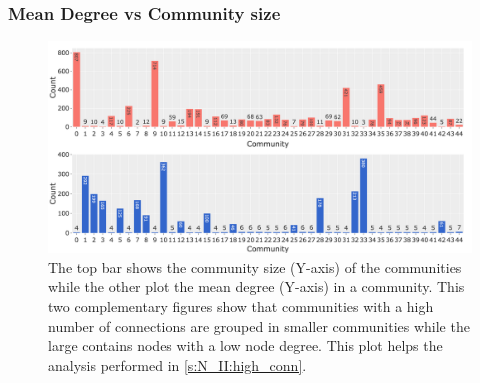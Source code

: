 \subsubsection{Mean Degree vs Community size}
\begin{figure}[!htb]    
    \centering
    \includegraphics[width=1.0\textwidth,height=1.0\textheight,keepaspectratio]{Sections/Network_II/resources/reward/Degree_vs_ComSize.png}
    \caption{The top bar shows the community size (Y-axis) of the communities while the other plot the mean degree (Y-axis) in a community. This two complementary figures show that communities with a high number of connections are grouped in smaller communities while the large contains nodes with a low node degree. This plot helps the analysis performed in \cref{s:N_II:high_conn}. } 
    \label{fig:ap:degree_com_size}
\end{figure}
